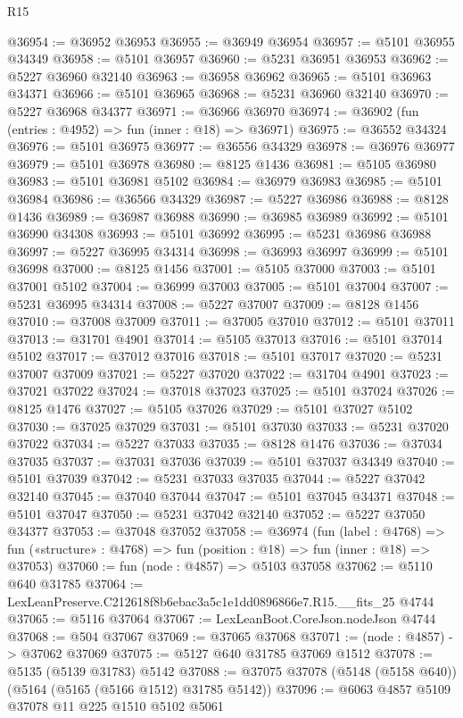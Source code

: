 \begin{lexlean}{R15}
\begin{coremodule}
{{{{{{{{{{{@36954 := @36952 @36953
@36955 := @36949 @36954
@36957 := @5101 @36955 @34349
@36958 := @5101 @36957
@36960 := @5231 @36951 @36953
@36962 := @5227 @36960 @32140
@36963 := @36958 @36962
@36965 := @5101 @36963 @34371
@36966 := @5101 @36965
@36968 := @5231 @36960 @32140
@36970 := @5227 @36968 @34377
@36971 := @36966 @36970
@36974 := @36902 (fun (entries : @4952) => fun (inner : @18) => @36971)
@36975 := @36552 @34324
@36976 := @5101 @36975
@36977 := @36556 @34329
@36978 := @36976 @36977
@36979 := @5101 @36978
@36980 := @8125 @1436
@36981 := @5105 @36980
@36983 := @5101 @36981 @5102
@36984 := @36979 @36983
@36985 := @5101 @36984
@36986 := @36566 @34329
@36987 := @5227 @36986
@36988 := @8128 @1436
@36989 := @36987 @36988
@36990 := @36985 @36989
@36992 := @5101 @36990 @34308
@36993 := @5101 @36992
@36995 := @5231 @36986 @36988
@36997 := @5227 @36995 @34314
@36998 := @36993 @36997
@36999 := @5101 @36998
@37000 := @8125 @1456
@37001 := @5105 @37000
@37003 := @5101 @37001 @5102
@37004 := @36999 @37003
@37005 := @5101 @37004
@37007 := @5231 @36995 @34314
@37008 := @5227 @37007
@37009 := @8128 @1456
@37010 := @37008 @37009
@37011 := @37005 @37010
@37012 := @5101 @37011
@37013 := @31701 @4901
@37014 := @5105 @37013
@37016 := @5101 @37014 @5102
@37017 := @37012 @37016
@37018 := @5101 @37017
@37020 := @5231 @37007 @37009
@37021 := @5227 @37020
@37022 := @31704 @4901
@37023 := @37021 @37022
@37024 := @37018 @37023
@37025 := @5101 @37024
@37026 := @8125 @1476
@37027 := @5105 @37026
@37029 := @5101 @37027 @5102
@37030 := @37025 @37029
@37031 := @5101 @37030
@37033 := @5231 @37020 @37022
@37034 := @5227 @37033
@37035 := @8128 @1476
@37036 := @37034 @37035
@37037 := @37031 @37036
@37039 := @5101 @37037 @34349
@37040 := @5101 @37039
@37042 := @5231 @37033 @37035
@37044 := @5227 @37042 @32140
@37045 := @37040 @37044
@37047 := @5101 @37045 @34371
@37048 := @5101 @37047
@37050 := @5231 @37042 @32140
@37052 := @5227 @37050 @34377
@37053 := @37048 @37052
@37058 := @36974
    (fun (label : @4768) =>
    fun («structure» : @4768) => fun (position : @18) => fun (inner : @18) => @37053)
@37060 := fun (node : @4857) => @5103 @37058
@37062 := @5110 @640 @31785
@37064 := LexLeanPreserve.C212618f8b6ebac3a5c1e1dd0896866e7.R15.__fits_25 @4744
@37065 := @5116 @37064
@37067 := LexLeanBoot.CoreJson.nodeJson @4744
@37068 := @504 @37067
@37069 := @37065 @37068
@37071 := (node : @4857) -> @37062 @37069
@37075 := @5127 @640 @31785 @37069 @1512
@37078 := @5135 (@5139 @31783) @5142
@37088 := @37075 @37078 (@5148 (@5158 @640)) (@5164 (@5165 (@5166 @1512) @31785 @5142))
@37096 := @6063 @4857 @5109 @37078 @11 @225 @1510 @5102 @5061
}}}}}}}}}}}
\end{coremodule}
\end{lexlean}
